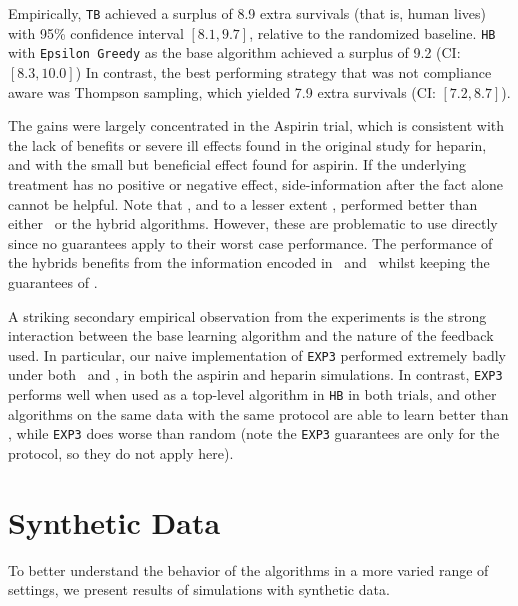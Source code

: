 Empirically, \texttt{TB} achieved a surplus of 8.9 extra survivals (that is, human lives) with 95\% confidence interval $[8.1,9.7]$, relative to the randomized baseline.
\texttt{HB} with \texttt{Epsilon Greedy} as the base algorithm achieved a surplus of 9.2 (CI: $[8.3,10.0]$)
In contrast, the best performing strategy that was not compliance aware was Thompson sampling, which yielded 7.9 extra survivals (CI: $[7.2,8.7]$). 

The gains were largely concentrated in the Aspirin trial, which is consistent with the lack of benefits or severe ill effects found in the original study \cite{ist:97} for heparin, and with the small but beneficial effect found for aspirin. 
If the underlying treatment has no positive or negative effect, side-information after the fact alone cannot be helpful.
Note that \actual, and to a lesser extent \comply, performed better than either \chosen\, or the hybrid algorithms. However, these are problematic to use directly since no guarantees apply to their worst case performance. The performance of the hybrids benefits from the information encoded in \actual\, and \comply\, whilst keeping the guarantees of \chosen. 


A striking secondary empirical observation from the experiments is the strong interaction between the base learning algorithm and the nature of the feedback used. In particular, our naive implementation of \texttt{EXP3} performed extremely badly under both \actual\, and \comply, in both the aspirin and heparin simulations. In contrast, \texttt{EXP3} performs well when used as a top-level algorithm in \texttt{HB} in both trials, and other algorithms on the same data with the same protocol are able to learn better than \chosen, while \texttt{EXP3} does worse than random (note the \texttt{EXP3} guarantees are only for the \chosen\, protocol, so they do not apply here).



\section{Synthetic Data}


To better understand the behavior of the algorithms in a more varied range of settings, we present results of simulations with synthetic data.



